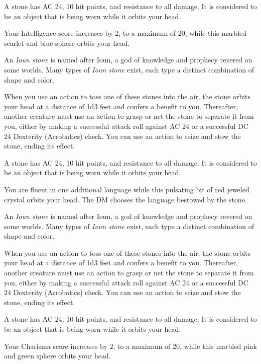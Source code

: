 \documentclass[10pt,a4paper,twoside,bg=print,twocolumn,openany,nodeprecatedcode]{dndbook}
\begin{document}
A stone has AC 24, 10 hit points, and resistance to all damage. It is considered to be an object that is being worn while it orbits your head.

Your Intelligence score increases by 2, to a maximum of 20, while this marbled scarlet and blue sphere orbits your head.

An \textit{Ioun stone} is named after Ioun, a god of knowledge and prophecy revered on some worlds. Many types of \textit{Ioun stone} exist, each type a distinct combination of shape and color.

When you use an action to toss one of these stones into the air, the stone orbits your head at a distance of 1d3 feet and confers a benefit to you. Thereafter, another creature must use an action to grasp or net the stone to separate it from you, either by making a successful attack roll against AC 24 or a successful DC 24 Dexterity (Acrobatics) check. You can use an action to seize and stow the stone, ending its effect.

A stone has AC 24, 10 hit points, and resistance to all damage. It is considered to be an object that is being worn while it orbits your head.

You are fluent in one additional language while this pulsating bit of red jeweled crystal orbits your head. The DM chooses the language bestowed by the stone.

An \textit{Ioun stone} is named after Ioun, a god of knowledge and prophecy revered on some worlds. Many types of \textit{Ioun stone} exist, each type a distinct combination of shape and color.

When you use an action to toss one of these stones into the air, the stone orbits your head at a distance of 1d3 feet and confers a benefit to you. Thereafter, another creature must use an action to grasp or net the stone to separate it from you, either by making a successful attack roll against AC 24 or a successful DC 24 Dexterity (Acrobatics) check. You can use an action to seize and stow the stone, ending its effect.

A stone has AC 24, 10 hit points, and resistance to all damage. It is considered to be an object that is being worn while it orbits your head.

Your Charisma score increases by 2, to a maximum of 20, while this marbled pink and green sphere orbits your head.
\end{document}
